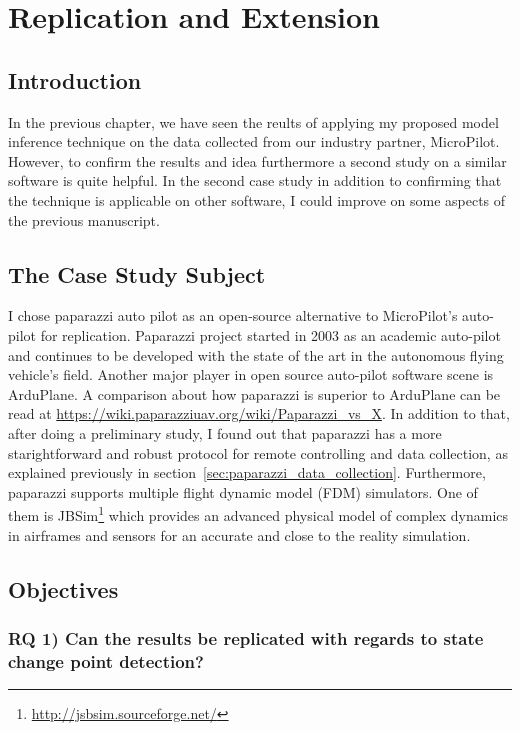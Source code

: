 \chapter{Replication and Extension}

\section{Introduction}

In the previous chapter, we have seen the reults of applying my proposed model inference technique on the data collected from our industry partner, MicroPilot. However, to confirm the results and idea furthermore a second study on a similar software is quite helpful. In the second case study in addition to confirming that the technique is applicable on other software, I could improve on some aspects of the previous manuscript.


\section{The Case Study Subject}

I chose paparazzi auto pilot as an open-source alternative to MicroPilot's auto-pilot for replication. Paparazzi \cite{hattenberger2014using} project started in 2003 as an academic auto-pilot and continues to be developed with the state of the art in the autonomous flying vehicle's field. Another major player in open source auto-pilot software scene is ArduPlane. A comparison about how paparazzi is superior to ArduPlane can be read at \url{https://wiki.paparazziuav.org/wiki/Paparazzi_vs_X}. 
In addition to that, after doing a preliminary study, I found out that paparazzi has a more starightforward and robust protocol for remote controlling and data collection, as explained previously in section~\ref{sec:paparazzi_data_collection}. 
Furthermore, paparazzi supports multiple flight dynamic model (FDM) simulators. One of them is JBSim\footnote{\url{http://jsbsim.sourceforge.net/}} which provides an advanced physical model of complex dynamics in airframes and sensors for an accurate and close to the reality simulation. 


\section{Objectives}
\subsection{RQ 1) Can the results be replicated with regards to state change point detection?}

